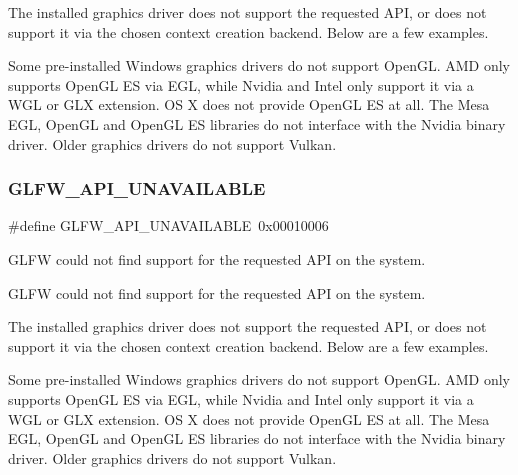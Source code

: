 The installed graphics driver does not support the requested A\+PI, or does not support it via the chosen context creation backend. Below are a few examples.

\begin{DoxyParagraph}{}
Some pre-\/installed Windows graphics drivers do not support Open\+GL. A\+MD only supports Open\+GL ES via E\+GL, while Nvidia and Intel only support it via a W\+GL or G\+LX extension. OS X does not provide Open\+GL ES at all. The Mesa E\+GL, Open\+GL and Open\+GL ES libraries do not interface with the Nvidia binary driver. Older graphics drivers do not support Vulkan. 
\end{DoxyParagraph}
\mbox{\label{group__errors_ga56882b290db23261cc6c053c40c2d08e}} 
\subsubsection{\texorpdfstring{G\+L\+F\+W\+\_\+\+A\+P\+I\+\_\+\+U\+N\+A\+V\+A\+I\+L\+A\+B\+LE}{GLFW\_API\_UNAVAILABLE}\hspace{0.1cm}{\footnotesize\ttfamily [4/5]}}
{\footnotesize\ttfamily \#define G\+L\+F\+W\+\_\+\+A\+P\+I\+\_\+\+U\+N\+A\+V\+A\+I\+L\+A\+B\+LE~0x00010006}



G\+L\+FW could not find support for the requested A\+PI on the system. 

G\+L\+FW could not find support for the requested A\+PI on the system.

The installed graphics driver does not support the requested A\+PI, or does not support it via the chosen context creation backend. Below are a few examples.

\begin{DoxyParagraph}{}
Some pre-\/installed Windows graphics drivers do not support Open\+GL. A\+MD only supports Open\+GL ES via E\+GL, while Nvidia and Intel only support it via a W\+GL or G\+LX extension. OS X does not provide Open\+GL ES at all. The Mesa E\+GL, Open\+GL and Open\+GL ES libraries do not interface with the Nvidia binary driver. Older graphics drivers do not support Vulkan. 
\end{DoxyParagraph}
\mbox{\label{group__errors_ga56882b290db23261cc6c053c40c2d08e}} 
